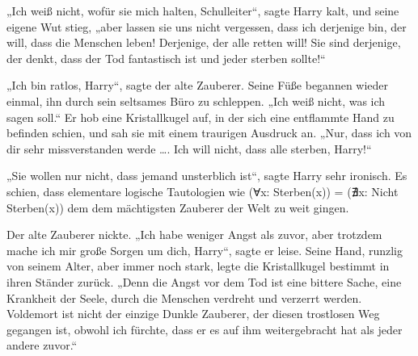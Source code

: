 „Ich weiß nicht, wofür sie mich halten, Schulleiter“, sagte Harry kalt, und seine eigene Wut stieg, „aber lassen sie uns nicht vergessen, dass ich derjenige bin, der will, dass die Menschen leben! Derjenige, der alle retten will! Sie sind derjenige, der denkt, dass der Tod fantastisch ist und jeder sterben sollte!“

„Ich bin ratlos, Harry“, sagte der alte Zauberer. Seine Füße begannen wieder einmal, ihn durch sein seltsames Büro zu schleppen.
„Ich weiß nicht, was ich sagen soll.“ Er hob eine Kristallkugel auf, in der sich eine entflammte Hand zu befinden schien, und sah sie mit einem traurigen Ausdruck an.
„Nur, dass ich von dir sehr missverstanden werde …. Ich will nicht, dass alle sterben, Harry!“

„Sie wollen nur nicht, dass jemand unsterblich ist“, sagte Harry sehr ironisch. Es schien, dass elementare logische Tautologien wie (Ɐx: Sterben(x)) = (∄x: Nicht Sterben(x)) dem dem mächtigsten Zauberer der Welt zu weit gingen.%

Der alte Zauberer nickte.
„Ich habe weniger Angst als zuvor, aber trotzdem mache ich mir große Sorgen um dich, Harry“, sagte er leise. Seine Hand, runzlig von seinem Alter, aber immer noch stark, legte die Kristallkugel bestimmt in ihren Ständer zurück.
„Denn die Angst vor dem Tod ist eine bittere Sache, eine Krankheit der Seele, durch die Menschen verdreht und verzerrt werden. Voldemort ist nicht der einzige Dunkle Zauberer, der diesen trostlosen Weg gegangen ist, obwohl ich fürchte, dass er es auf ihm weitergebracht hat als jeder andere zuvor.“

